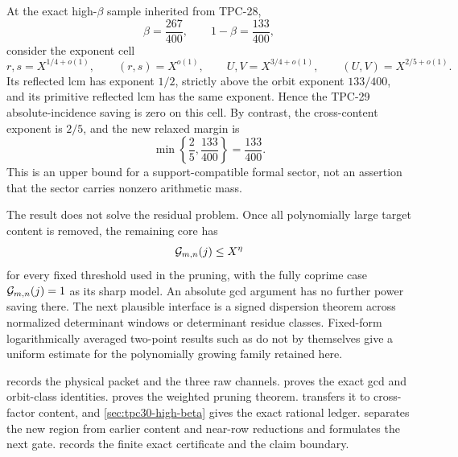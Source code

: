 At the exact high-$\beta$ sample inherited from TPC-28,
\begin{equation}
 \beta=\frac{267}{400},
 \qquad
 1-\beta=\frac{133}{400},
 \label{eq:tpc30-intro-high-beta}
\end{equation}
consider the exponent cell
\begin{equation}
 r,s=X^{1/4+o(1)},\qquad
 (r,s)=X^{o(1)},\qquad
 U,V=X^{3/4+o(1)},\qquad
 (U,V)=X^{2/5+o(1)}.
 \label{eq:tpc30-intro-high-cell}
\end{equation}
Its reflected lcm has exponent $1/2$, strictly above the orbit
exponent $133/400$, and its primitive reflected lcm has the same
exponent.  Hence the TPC-29 absolute-incidence saving is zero on this
cell.  By contrast, the cross-content exponent is $2/5$, and the new
relaxed margin is
\begin{equation}
 \min\left\{\frac25,\frac{133}{400}\right\}
 =\boxed{\frac{133}{400}}.
 \label{eq:tpc30-intro-high-margin}
\end{equation}
This is an upper bound for a support-compatible formal sector, not an assertion that
the sector carries nonzero arithmetic mass.

The result does not solve the residual problem.  Once all
polynomially large target content is removed, the remaining core has
\begin{equation}
 \mathcal G_{m,n}(j)\le X^\eta
 \label{eq:tpc30-intro-small-core}
\end{equation}
for every fixed threshold used in the pruning, with the fully coprime
case $\mathcal G_{m,n}(j)=1$ as its sharp model.  An absolute gcd argument
has no further power saving there.  The next plausible interface is a
signed dispersion theorem across normalized determinant windows or
determinant residue classes.  Fixed-form logarithmically averaged
two-point results such as \citep{Tao2016} do not by themselves give a
uniform estimate for the polynomially growing family retained here.

 records the physical packet and the three
raw channels.   proves the exact gcd
and orbit-class identities.   proves the
weighted pruning theorem.   transfers it
to cross-factor content, and \cref{sec:tpc30-high-beta} gives the
exact rational ledger.   separates the new
region from earlier content and near-row reductions and formulates
the next gate.   records the finite exact
certificate and the claim boundary.
